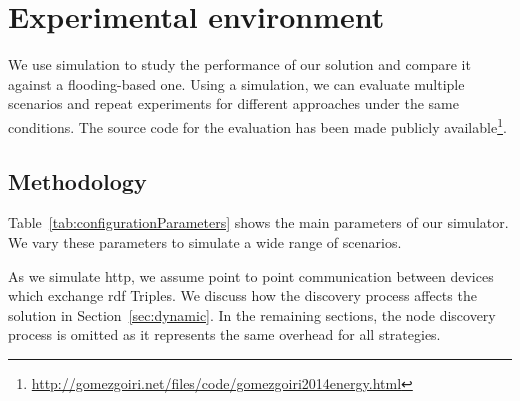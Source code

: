 \section{Experimental environment}
\label{environment}
We use simulation to study the performance of our solution and compare it against a flooding-based one.
Using a simulation, we can evaluate multiple scenarios and repeat experiments for different approaches under the same conditions.
The source code for the evaluation has been made publicly available\footnote{\url{http://gomezgoiri.net/files/code/gomezgoiri2014energy.html}}.

\subsection{Methodology}
Table~\ref{tab:configurationParameters} shows the main parameters of our simulator.
We vary these parameters to simulate a wide range of scenarios.





As we simulate \ac{http}, we assume point to point communication between devices which exchange \ac{rdf} Triples.
We discuss how the discovery process affects the solution in Section~\ref{sec:dynamic}.
In the remaining sections, the node discovery process is omitted as it represents the same overhead for all strategies.


